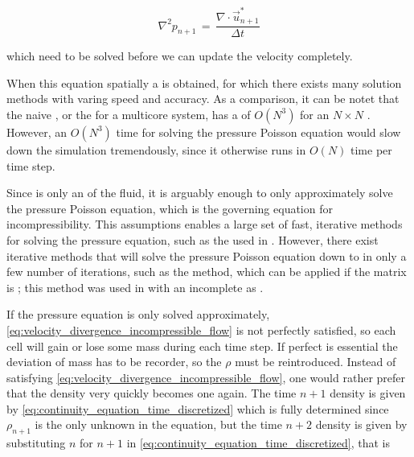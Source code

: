 \begin{equation} \label{eq:pressure_poissin_equation_incompressible_flow}
\nabla^2 p_{n+1} \,=\, \frac{\nabla\cdot\vec{u}^*_{n+1}}{\Delta t}
\end{equation}

which need to be solved before we can update the velocity completely.

When  this equation spatially a  is obtained, for which there exists many solution methods with varing speed and accuracy. As a comparison, it can be notet that the naive  \algorithm, or the  \algorithm for a multicore system, has a  of $O(N^3)$ for an $N\times N$ . However, an $O(N^3)$ time for solving the pressure Poisson equation would slow down the simulation tremendously, since it otherwise runs in $O(N)$ time per time step.

Since \incompressibility is only an \approximate \property of the fluid, it is arguably enough to only approximately solve the pressure Poisson equation, which is the governing equation for incompressibility. This assumptions enables a large set of fast, iterative methods for solving the pressure equation, such as the   used in \citep{Popinet2003}. However, there exist iterative methods that will solve the pressure Poisson equation down to  in only a few number of iterations, such as the \PCG method, which can be applied if the matrix is ; this method was used in \citep{Losasso2004} with an incomplete  as \preconditioner.

If the pressure equation is only solved approximately, \eqref{eq:velocity_divergence_incompressible_flow} is not perfectly satisfied, so each cell will gain or lose some mass during each time step. If perfect  is essential the deviation of mass has to be recorder, so the  $\rho$ must be reintroduced. Instead of satisfying \eqref{eq:velocity_divergence_incompressible_flow}, one would rather prefer that the density very quickly becomes one again. The time $n+1$ density is given by \eqref{eq:continuity_equation_time_discretized} which is fully determined since $\rho_{n+1}$ is the only unknown in the equation, but the time $n+2$ density is given by substituting $n$ for $n+1$ in \eqref{eq:continuity_equation_time_discretized}, that is

